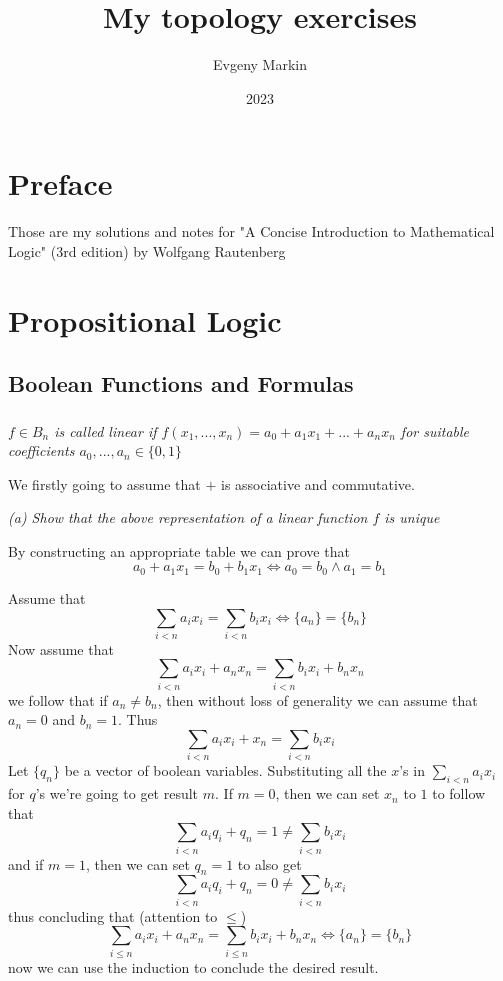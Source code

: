 \documentclass[11pt,oneside,titlepage]{book}
\title{My topology exercises}
\author{Evgeny Markin}
\date{2023}
\DeclareMathOperator \lra {\Leftrightarrow}
\newcommand{\set}[1]{\{ #1 \}}
\begin{document}
\maketitle
\tableofcontents

\chapter*{Preface}

Those are my solutions and notes for "A Concise Introduction to Mathematical Logic" (3rd edition)
by Wolfgang Rautenberg

\chapter{Propositional Logic}

\section{Boolean Functions and Formulas}

\subsection{}

\textit{$f \in B_n$ is called linear if $f(x_1, ..., x_n) = a_0 + a_1 x_1 + ... + a_n x_n$ for
  suitable coefficients $a_0, ..., a_n \in \set{0, 1}$}

We firstly going to assume that $+$ is associative and commutative.

\textit{(a) Show that the above representation of a linear function $f$ is unique}

By constructing an appropriate table we can prove that
$$a_0 + a_1 x_1 = b_0 + b_1 x_1 \iff a_0 = b_0 \land a_1 = b_1$$

Assume that
$$\sum_{i < n}{a_i x_i} = \sum_{i < n}{b_i x_i} \iff \set{a_n} = \set{b_n}$$
Now assume that
$$\sum_{i < n}{a_i x_i} + a_n x_n = \sum_{i < n}{b_i x_i} + b_n x_n$$
we follow that if $a_n \neq b_n$, then without loss of generality we can assume that
$a_n = 0$ and $b_n = 1$. Thus
$$\sum_{i < n}{a_i x_i} + x_n = \sum_{i < n}{b_i x_i}$$
Let $\set{q_n}$ be a vector of boolean variables. Substituting all the $x$'s in
$\sum_{i < n}{a_i x_i}$ for $q$'s we're going to get result $m$. If $m = 0$, then we can
set $x_n$ to $1$ to follow that
$$\sum_{i < n}{a_i q_i} + q_n = 1 \neq  \sum_{i < n}{b_i x_i}$$
and if $m = 1$, then we can set $q_n = 1$ to also get
$$\sum_{i < n}{a_i q_i} + q_n = 0 \neq  \sum_{i < n}{b_i x_i}$$
thus concluding that (attention to $\leq$)
$$\sum_{i \leq n}{a_i x_i} + a_n x_n = \sum_{i \leq n}{b_i x_i} + b_n x_n \lra \set{a_n} = \set{b_n}$$
now we can use the induction to conclude the desired result.
\end{document}

